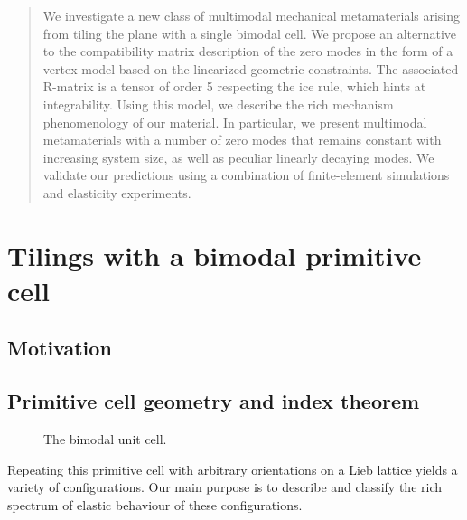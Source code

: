 \maketitle

\begin{abstract}
	We investigate a new class of multimodal mechanical metamaterials arising from tiling the plane with a single bimodal cell. We propose an alternative to the compatibility matrix description of the zero modes in the form of a vertex model based on the linearized geometric constraints. The associated R-matrix is a tensor of order 5 respecting the ice rule, which hints at integrability. Using this model, we describe the rich mechanism phenomenology of our material. In particular, we present multimodal metamaterials with a number of zero modes that remains constant with increasing system size, as well as peculiar linearly decaying modes. We validate our predictions using a combination of finite-element simulations and elasticity experiments.
\end{abstract}

\tableofcontents
		
\chapter{Tilings with a bimodal primitive cell}

\section{Motivation}


\section{Primitive cell geometry and index theorem}
	
			\begin{figure}[!ht]
				\centering{
				\scalebox{1}{
				\begin{tikzpicture}
					\bimcell		
				\end{tikzpicture}
				}
				}
				\caption{The bimodal unit cell.}
				\label{fig:primitive}
			\end{figure}
			
	Repeating this primitive cell with arbitrary orientations on a Lieb lattice yields a variety of configurations. Our main purpose is to describe and classify the rich spectrum of elastic behaviour of these configurations.
			
